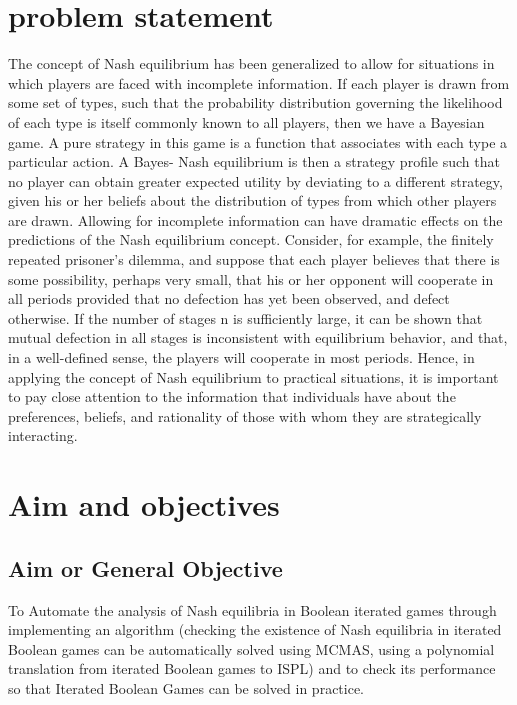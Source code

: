 \documentclass[14pt, a4paper]{article}
\begin{document}
				
			\section{problem statement}
The concept of Nash equilibrium has been generalized to allow for situations in which players are faced with incomplete information. If each player is drawn from some set of types, such that the probability distribution governing the likelihood of each type is itself commonly known to all players, then we have a Bayesian game. A pure strategy in this game is a function that associates with each type a particular action. A Bayes- Nash equilibrium is then a strategy profile such that no player can obtain greater expected utility by deviating to a
different strategy, given his or her beliefs about the distribution of types from which other players are drawn. Allowing for incomplete information can have dramatic effects on the predictions of the Nash equilibrium concept. Consider, for example, the finitely repeated prisoner’s
dilemma, and suppose that each player believes that there is some possibility, perhaps very small, that his or her opponent will cooperate in all periods provided that no defection has yet been observed, and defect otherwise. If the number of stages n is sufficiently large, it can be shown that mutual defection in all stages is inconsistent with equilibrium behavior, and that, in a well-defined sense, the players will cooperate in most periods. Hence, in applying the concept of Nash equilibrium to practical situations, it is important to pay close attention to the
information that individuals have about the preferences, beliefs, and rationality of those with whom they are strategically interacting.
			
			
			
			\section{Aim and objectives}
			
				\subsection{Aim or General Objective}
To Automate the analysis of Nash equilibria in Boolean iterated games through implementing an algorithm (checking the existence of Nash equilibria in iterated Boolean games can be automatically solved using MCMAS, using a polynomial translation from iterated Boolean games to ISPL) and to check its performance so that Iterated Boolean Games can be solved in practice.
		
\end{document}
